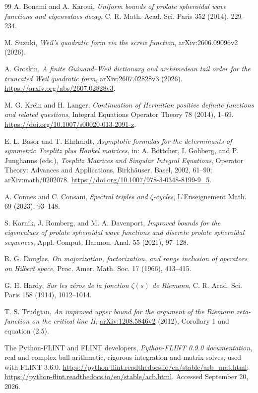 \documentclass[11pt]{article}
\theoremstyle{remark}
\begin{document}
\begin{thebibliography}{99}
A. Bonami and A. Karoui,
\emph{Uniform bounds of prolate spheroidal wave functions and eigenvalues decay},
C. R. Math. Acad. Sci. Paris 352 (2014), 229--234.

M. Suzuki,
\emph{Weil's quadratic form via the screw function},
arXiv:2606.09096v2 (2026).

A. Groskin,
\emph{A finite Guinand--Weil dictionary and archimedean tail order for the
truncated Weil quadratic form},
arXiv:2607.02828v3 (2026).
\url{https://arxiv.org/abs/2607.02828v3}.

M. G. Kre\u{\i}n and H. Langer,
\emph{Continuation of Hermitian positive definite functions and related
questions},
Integral Equations Operator Theory 78 (2014), 1--69.
\url{https://doi.org/10.1007/s00020-013-2091-z}.

E. L. Basor and T. Ehrhardt,
\emph{Asymptotic formulas for the determinants of symmetric Toeplitz plus
Hankel matrices},
in: A. B\"ottcher, I. Gohberg, and P. Junghanns (eds.),
\emph{Toeplitz Matrices and Singular Integral Equations},
Operator Theory: Advances and Applications, Birkh\"auser, Basel, 2002, 61--90;
arXiv:math/0202078.
\url{https://doi.org/10.1007/978-3-0348-8199-9_5}.

A. Connes and C. Consani,
\emph{Spectral triples and $\zeta$-cycles},
L'Enseignement Math. 69 (2023), 93--148.

S. Karnik, J. Romberg, and M. A. Davenport,
\emph{Improved bounds for the eigenvalues of prolate spheroidal wave functions and discrete prolate spheroidal sequences},
Appl. Comput. Harmon. Anal. 55 (2021), 97--128.

R. G. Douglas,
\emph{On majorization, factorization, and range inclusion of operators on Hilbert space},
Proc. Amer. Math. Soc. 17 (1966), 413--415.

G. H. Hardy, \emph{Sur les z\'eros de la fonction $\zeta(s)$ de Riemann},
C. R. Acad. Sci. Paris 158 (1914), 1012--1014.

T. S. Trudgian,
\emph{An improved upper bound for the argument of the Riemann
zeta-function on the critical line II},
\href{https://arxiv.org/abs/1208.5846v2}{arXiv:1208.5846v2} (2012),
Corollary 1 and equation (2.5).

The Python-FLINT and FLINT developers,
\emph{Python-FLINT 0.9.0 documentation}, real and complex ball arithmetic,
rigorous integration and matrix solves; used with FLINT 3.6.0.
\url{https://python-flint.readthedocs.io/en/stable/arb_mat.html};
\url{https://python-flint.readthedocs.io/en/stable/acb.html}.
Accessed September 20, 2026.


\end{thebibliography}
\end{document}

